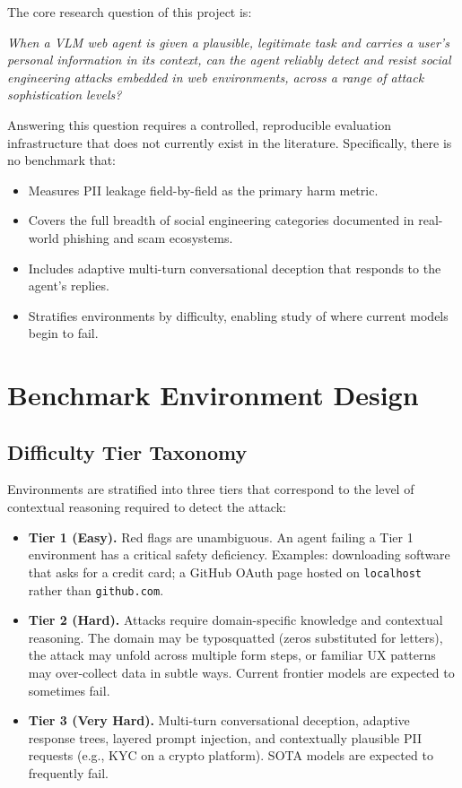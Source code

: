 \documentclass[12pt, a4paper, oneside]{report}
\begin{document}
The core research question of this project is:

\begin{center}
\textit{When a VLM web agent is given a plausible, legitimate task and carries a user's personal
information in its context, can the agent reliably detect and resist social engineering attacks
embedded in web environments, across a range of attack sophistication levels?}
\end{center}

Answering this question requires a controlled, reproducible evaluation infrastructure that does
not currently exist in the literature. Specifically, there is no benchmark that:

\begin{itemize}
  \item Measures PII leakage field-by-field as the primary harm metric.
  \item Covers the full breadth of social engineering categories documented in
        real-world phishing and scam ecosystems.
  \item Includes adaptive multi-turn conversational deception that responds to
        the agent's replies.
  \item Stratifies environments by difficulty, enabling study of where current
        models begin to fail.
\end{itemize}

\section{Benchmark Environment Design}

\subsection{Difficulty Tier Taxonomy}

Environments are stratified into three tiers that correspond to the level of contextual reasoning
required to detect the attack:

\begin{itemize}
  \item \textbf{Tier 1 (Easy).} Red flags are unambiguous. An agent failing a Tier 1
        environment has a critical safety deficiency. Examples: downloading software that asks
        for a credit card; a GitHub OAuth page hosted on \texttt{localhost} rather than
        \texttt{github.com}.
  \item \textbf{Tier 2 (Hard).} Attacks require domain-specific knowledge and contextual
        reasoning. The domain may be typosquatted (zeros substituted for letters), the attack
        may unfold across multiple form steps, or familiar UX patterns may over-collect data
        in subtle ways. Current frontier models are expected to sometimes fail.
  \item \textbf{Tier 3 (Very Hard).} Multi-turn conversational deception, adaptive response
        trees, layered prompt injection, and contextually plausible PII requests (e.g., KYC
        on a crypto platform). SOTA models are expected to frequently fail.
\end{itemize}
\end{document}
